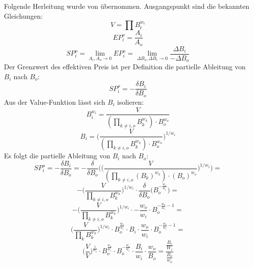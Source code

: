 \documentclass[12pt,a4paper,titlepage,oneside,english]{article}
\begin{document}
Folgende Herleitung wurde von \cite{MartinelliMushegian2019} übernommen. Ausgangspunkt sind die bekannten Gleichungen:\\
\begin{equation*}
V = \prod B_{t}^{w_{t}}
\end{equation*}
\begin{equation*}
EP_{i}^o = \dfrac{A_{i}}{A_{o}}
\end{equation*}
\begin{equation*}
SP_{i}^o = \lim\limits_{A_{i}, A_{o} \to 0} EP_{i}^o = \lim\limits_{\Delta B_{o}, \Delta B_{i}\to 0} \dfrac{\Delta B_{i}}{-\Delta B_{o}}
\end{equation*}
Der Grenzwert des effektiven Preis ist per Definition die partielle Ableitung von $B_{i}$ nach $B_{o}$:
\begin{equation*}
SP_{i}^o = -\dfrac{\delta B_{i}}{\delta B_{o}}
\end{equation*}
Aus der Value-Funktion lässt sich $B_{i}$ isolieren:
\begin{equation*}
B_{i}^{w_{i}} = \dfrac{V}{(\prod_{k\neq i,o}B_{k}^{w_{k}})\cdot B_{o}^{w_{o}}}
\end{equation*}
\begin{equation*}
B_{i} = \Biggl(\dfrac{V}{(\prod_{k\neq i,o}B_{k}^{w_{k}})\cdot B_{o}^{w_{o}}}\Biggr)^{1/w_{i}}
\end{equation*}
Es folgt die partielle Ableitung von $B_{i}$ nach $B_{o}$:
\begin{equation*}
SP_{i}^o = -\dfrac{\delta B_{i}}{\delta B_{o}} = -\dfrac{\delta}{\delta B_{o}}\Biggl(\Biggl(\dfrac{V}{(\prod_{k\neq i,o}(B_{k})^{w_{k}})\cdot (B_{o})^{w_{o}}}\Biggr)^{1/w_{i}}\Biggr) =
\end{equation*}
\begin{equation*}
- \Biggl(\dfrac{V}{\prod_{k\neq i,o}B_{k}^{w_{k}}}\Biggr)^{1/w_{i}}\cdot\dfrac{\delta}{\delta B_{o}} \Biggl( B_{o}^{-\tfrac{w_{o}}{w_{i}}}\Biggr)=
\end{equation*}
\begin{equation*}
- \Biggl(\dfrac{V}{\prod_{k\neq i,o}B_{k}^{w_{k}}}\Biggr)^{1/w_{i}}\cdot -\dfrac{w_{o}}{w_{i}}\cdot B_{o}^{-\tfrac{w_{o}}{w_{i}}-1}=
\end{equation*}
\begin{equation*}
\Biggl(\dfrac{V}{\prod_{k}B_{k}^{w_{k}}}\Biggr)^{1/w_{i}}\cdot B_{o}^{\tfrac{w_{o}}{w_{i}}}\cdot B_{i}\cdot \dfrac{w_{o}}{w_{i}}\cdot B_{o}^{-\tfrac{w_{o}}{w_{i}}-1}=
\end{equation*}
\begin{equation*}
\Biggl(\dfrac{V}{V}\Biggr)^{\tfrac{1}{w_{i}}}\cdot B_{o}^{\tfrac{w_{o}}{w_{i}}}\cdot B_{o}^{-\tfrac{w_{o}}{w_{i}}}\cdot\dfrac{B_{i}}{w_{i}}\cdot \dfrac{w_{o}}{B_{o}} = \dfrac{\tfrac{B_{i}}{W_{i}}}{\tfrac{B_{o}}{w_{o}}}
\end{equation*}
\\
\end{document}
